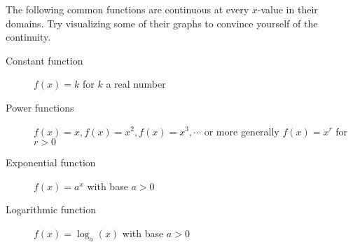 \documentclass{ximera}
\begin{document}
 
\begin{remark}
The following common functions are continuous at every $x$-value in their domains.  Try visualizing some of their graphs to convince yourself of the continuity. 
\begin{description}
\item[Constant function] $f(x) =k$ for $k$ a real number
\item[Power functions] $f(x)=x, f(x)=x^2, f(x)=x^3, \cdots$ or more generally $f(x)=x^r$ for $r>0$
\item[Exponential function] $f(x)=a^x$ with base $a>0$
\item[Logarithmic function] $f(x)=\log_a(x)$ with base $a>0$
\end{description}

 
\end{remark}
 
 
 

 
\end{document}
